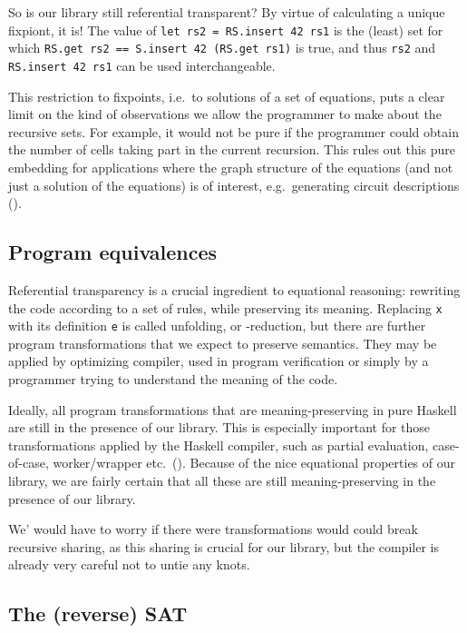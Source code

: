 \documentclass[manuscript,screen,acmsmall]{acmart}
\begin{document}
So is our library still referential transparent? By virtue of calculating a unique fixpiont, it is!  The value of \verb|let rs2 = RS.insert 42 rs1| is the (least) set for which \verb|RS.get rs2 == S.insert 42 (RS.get rs1)| is true, and thus \verb|rs2| and \verb|RS.insert 42 rs1| can be used interchangeable.

This restriction to fixpoints, i.e.\ to solutions of a set of equations, puts a clear limit on the kind of observations we allow the programmer to make about the recursive sets. For example, it would not be pure if the programmer could obtain the number of cells taking part in the current recursion. This rules out this pure embedding for applications where the graph structure of the equations (and not just a solution of the equations) is of interest, e.g.\ generating circuit descriptions (\cite{circuits}).

\subsection{Program equivalences}

Referential transparency is a crucial ingredient to equational reasoning: rewriting the code according to a set of rules, while preserving its meaning. Replacing \verb|x| with its definition \verb|e| is called unfolding, or \textdelta-reduction, but there are further program transformations that we expect to preserve semantics.  They may be applied by optimizing compiler, used in program verification or simply by a programmer trying to understand the meaning of the code.

Ideally, all program transformations that are meaning-preserving in pure Haskell are still in the presence of our library. This is especially important for those transformations applied by the Haskell compiler, such as partial evaluation, case-of-case, worker/wrapper etc.\ (\cite{optimiser}). Because of the nice equational properties of our library, we are fairly certain that all these are still meaning-preserving in the presence of our library.

We’ would have to worry if there were transformations would could break recursive sharing, as this sharing is crucial for our library, but the compiler is already very careful not to untie any knots.

\subsection{The (reverse) SAT}\label{sec:sat}
\end{document}
